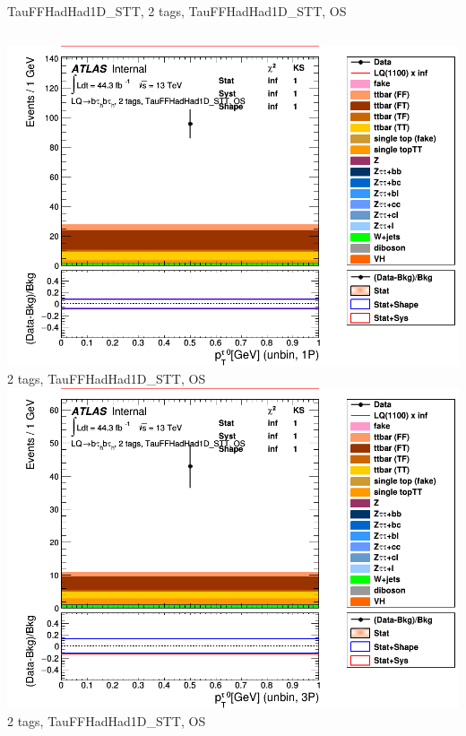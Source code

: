 \begin{frame}{TauFFHadHad1D\_STT, 2 tags, TauFFHadHad1D\_STT, OS}
\begin{columns}[c]
    \centering\includegraphics[width=\textwidth]{C_2tag2pjet_0ptv_OS_UnbinLeadTau1P}\\
    2 tags, TauFFHadHad1D\_STT, OS
    \centering\includegraphics[width=\textwidth]{C_2tag2pjet_0ptv_OS_UnbinLeadTau3P}\\
    2 tags, TauFFHadHad1D\_STT, OS
  \end{columns}
\end{frame}

